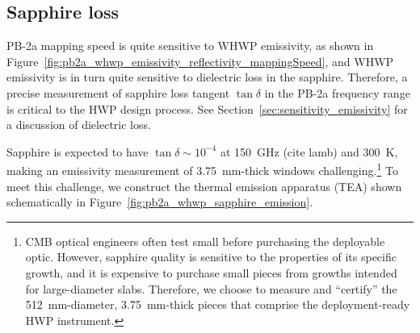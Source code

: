 
\subsection{Sapphire loss}
\label{sec:pb2a_whwp_sapphire_loss}

PB-2a mapping speed is quite sensitive to WHWP emissivity, as shown in Figure~\ref{fig:pb2a_whwp_emissivity_reflectivity_mappingSpeed}, and WHWP emissivity is in turn quite sensitive to dielectric loss in the sapphire. Therefore, a precise measurement of sapphire loss tangent $\tan \delta$ in the PB-2a frequency range is critical to the HWP design process. See Section~\ref{sec:sensitivity_emissivity} for a discussion of dielectric loss. 

Sapphire is expected to have $\tan \delta \sim 10^{-4}$ at 150~GHz (cite lamb) and 300~K, making an emissivity measurement of 3.75~mm-thick windows challenging.\footnote{CMB optical engineers often test small before purchasing the deployable optic. However, sapphire quality is sensitive to the properties of its specific growth, and it is expensive to purchase small pieces from growths intended for large-diameter slabs. Therefore, we choose to measure and ``certify'' the 512~mm-diameter, 3.75~mm-thick pieces that comprise the deployment-ready HWP instrument.} To meet this challenge, we construct the thermal emission apparatus (TEA) shown schematically in Figure~\ref{fig:pb2a_whwp_sapphire_emission}.

